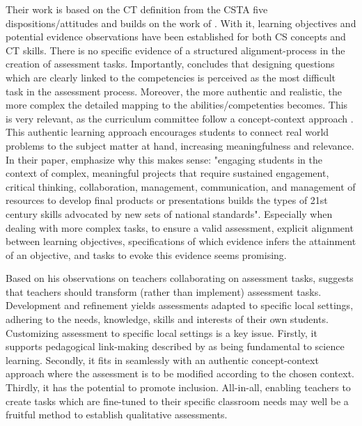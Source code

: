 Their work is based on the CT definition from the CSTA five dispositions/attitudes and builds on the work of . With it, learning objectives and potential evidence observations have been established for both CS concepts and CT skills. There is no specific evidence of a structured alignment-process in the creation of assessment tasks. Importantly,  concludes that designing questions which are clearly linked to the competencies is perceived as the most difficult task in the assessment process. Moreover, the more authentic and realistic, the more complex the detailed mapping to the abilities/competenties becomes. This is very relevant, as the curriculum committee follow a concept-context approach \cite{Barendsen2016}. This authentic learning approach encourages students to connect real world problems to the subject matter at hand, increasing meaningfulness and relevance. In their paper,  emphasize why this makes sense: "engaging students in the context of complex, meaningful projects that require sustained engagement, critical thinking, collaboration, management, communication, and management of resources to develop final products or presentations builds the types of 21st century skills advocated by new sets of national standards". Especially when dealing with more complex tasks, to ensure a valid assessment, explicit alignment between learning objectives, specifications of which evidence infers the attainment of an objective, and tasks to evoke this evidence seems promising.


Based on his observations on teachers collaborating on assessment tasks, \citeauthor{hermansen2014reworking} suggests that teachers should transform (rather than implement) assessment tasks. Development and refinement yields assessments adapted to specific local settings, adhering to the needs, knowledge, skills and interests of their own students. Customizing assessment to specific local settings is a key issue. Firstly, it supports pedagogical link-making described by  as being fundamental to science learning. Secondly, it fits in seamlessly with an authentic concept-context approach where the assessment is to be modified according to the chosen context. Thirdly, it has the potential to promote inclusion. All-in-all, enabling teachers to create tasks which are fine-tuned to their specific classroom needs may well be a fruitful method to establish qualitative assessments.


